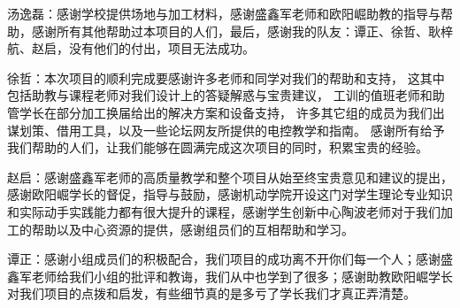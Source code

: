 

\begin{acknowledgements}
  汤逸磊：感谢学校提供场地与加工材料，感谢盛鑫军老师和欧阳崛助教的指导与帮助，感谢所有其他帮助过本项目的人们，最后，感谢我的队友：谭正、徐哲、耿梓航、赵启，没有他们的付出，项目无法成功。

  徐哲：本次项目的顺利完成要感谢许多老师和同学对我们的帮助和支持，
  这其中包括助教与课程老师对我们设计上的答疑解惑与宝贵建议，
  工训的值班老师和助管学长在部分加工换届给出的解决方案和设备支持，
  许多其它组的成员为我们出谋划策、借用工具，以及一些论坛网友所提供的电控教学和指南。
  感谢所有给予我们帮助的人们，让我们能够在圆满完成这次项目的同时，积累宝贵的经验。

  赵启：感谢盛鑫军老师的高质量教学和整个项目从始至终宝贵意见和建议的提出，感谢欧阳崛学长的督促，指导与鼓励，感谢机动学院开设这门对学生理论专业知识和实际动手实践能力都有很大提升的课程，感谢学生创新中心陶波老师对于我们加工的帮助以及中心资源的提供，感谢组员们的互相帮助和学习。

  谭正：感谢小组成员们的积极配合，我们项目的成功离不开你们每一个人；感谢盛鑫军老师给我们小组的批评和教诲，我们从中也学到了很多；感谢助教欧阳崛学长对我们项目的点拨和启发，有些细节真的是多亏了学长我们才真正弄清楚。

\end{acknowledgements}


